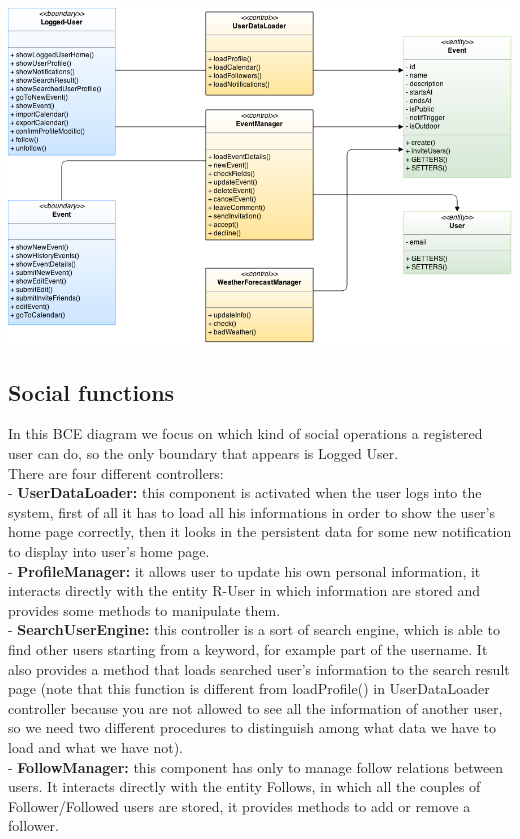 \documentclass[12pt]{book}
\begin{document}
\vspace{2cm}
\includegraphics[scale=0.45]{user_events_BCE}\\

\newpage
\subsection{Social functions}
In this BCE diagram we focus on which kind of social operations a registered user can do, so the only boundary that appears is Logged User.\\
There are four different controllers:\\
- \textbf{UserDataLoader:}
	this component is activated when the user logs into the system, first of all it has to load all his informations in order to show the user's home page correctly, then it looks in the persistent data for some new notification to display into user's home page.\\
- \textbf{ProfileManager: }
	it allows user to update his own personal information, it interacts directly with the entity R-User in which information are stored and provides some methods to manipulate them.\\
- \textbf{SearchUserEngine: }
	this controller is a sort of search engine, which is able to find other users starting from a keyword, for example part of the username. It also provides a method that loads searched user's information to the search result page (note that this function is different from loadProfile() in UserDataLoader controller because you are not allowed to see all the information of another user, so we need two different procedures to distinguish among what data we have to load and what we have not).\\
- \textbf{FollowManager: }
	this component has only to manage follow relations between users. It interacts directly with the entity Follows, in which all the couples of Follower/Followed users are stored, it provides 	methods to add or remove a follower.\\
	
\end{document}
